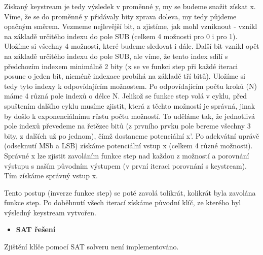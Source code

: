 \documentclass[11pt,a4paper]{article}
\begin{document}
Získaný keystream je tedy výsledek v proměnné y, my se budeme snažit získat x. Víme, že se do proměnné y přidávaly bity zprava doleva, my tedy půjdeme opačným směrem. Vezmeme nejlevější bit, a zjistíme, jak mohl vzniknout - vznikl na základě určitého indexu do pole SUB (celkem 4 možnosti pro 0 i pro 1). Uložíme si všechny 4 možnosti, které budeme sledovat i dále. Další bit vznikl opět na základě určitého indexu do pole SUB, ale víme, že tento index sdílí s předchozím indexem minimálně 2 bity (x se ve funkci step při každé iteraci posune o jeden bit, nicméně indexace probíhá na základě tří bitů). Uložíme si tedy tyto indexy k odpovídajícím možnostem. Po odpovídajícím počtu kroků (N) máme 4 různá pole indexů o délce N. Jelikož se funkce step volá v cyklu, před spuštením dalšího cyklu musíme zjistit, která z těchto možností je správná, jinak by došlo k exponenciálnímu růstu počtu možností. To uděláme tak, že jednotlivá pole indexů převedeme na řetězec bitů (z prvního prvku pole bereme všechny 3 bity, z dalších už po jednom), čímž dostaneme potenciální x'. Po adekvátní uprávě (odseknutí MSb a LSB) získáme potenciální vstup x (celkem 4 různé možnosti). Správné x lze zjistit zavoláním funkce step nad každou z možností a porovnání výstupu s naším původním výstupem (v první iteraci porovnání s keystream). Tím získáme správný vstup x.

Tento postup (inverze funkce step) se poté zavolá tolikrát, kolikrát byla zavolána funkce step. Po doběhnutí všech iterací získáme původní klíč, ze kterého byl výsledný keystream vytvořen.


\begin{itemize}[leftmargin=0cm]
\item{\textbf{SAT řešení}}
\end{itemize}
Zjištění klíče pomocí SAT solveru není implementováno.
\end{document}
